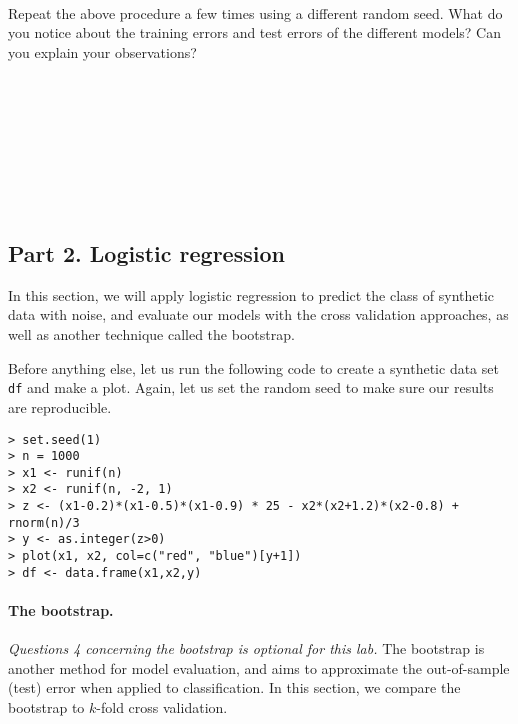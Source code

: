 \documentclass{article}
\begin{document}
\begin{Verbatim}[frame=single]


\end{Verbatim}

Repeat the above procedure a few times using a different random seed. What do
you notice about the training errors and test errors of the different models?
Can you explain your observations?
\begin{Verbatim}[frame=single]









\end{Verbatim}

\subsection*{Part 2. Logistic regression}
In this section, we will apply logistic regression to predict the class of
synthetic data with noise, and evaluate our models with the cross validation
approaches, as well as another technique called the bootstrap.

Before anything else, let us run the following code to create a synthetic data
set \texttt{df} and make a plot. Again, let us set the random seed to make sure
our results are reproducible.
\begin{Verbatim}[frame=single]
> set.seed(1)
> n = 1000
> x1 <- runif(n)
> x2 <- runif(n, -2, 1)
> z <- (x1-0.2)*(x1-0.5)*(x1-0.9) * 25 - x2*(x2+1.2)*(x2-0.8) + rnorm(n)/3
> y <- as.integer(z>0)
> plot(x1, x2, col=c("red", "blue")[y+1])
> df <- data.frame(x1,x2,y)
\end{Verbatim}

\paragraph{The bootstrap.} \textit{Questions 4 concerning the bootstrap is optional for this lab.} The bootstrap is another
method for model evaluation,
and aims to approximate the out-of-sample (test) error when applied to
classification. In this section, we compare the bootstrap to $k$-fold cross
validation.
\end{document}
